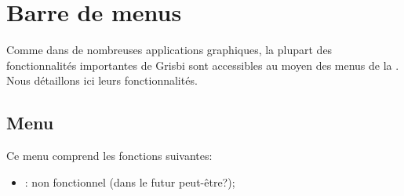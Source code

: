 
\section{Barre de menus\label{home-menus}}


Comme dans de nombreuses applications graphiques, la plupart des fonctionnalités importantes de Grisbi sont accessibles au moyen des menus de la . Nous détaillons ici leurs fonctionnalités.


\subsection{Menu \label{home-menus-file}}

Ce menu comprend les fonctions suivantes:

\vspace{3mm}
\begin{itemize}[rightmargin=.6cm]
	\item {}: non fonctionnel (dans le futur peut-être?);	%
\end{itemize}

